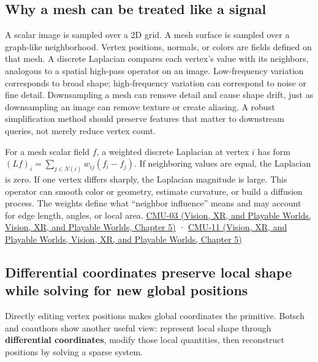 \subsection{Why a mesh can be treated like a signal}\label{03-visual-computing-i-ch002-why-a-mesh-can-be-treated-like-a-signal}

A scalar image is sampled over a 2D grid. A mesh surface is sampled over a graph-like neighborhood. Vertex positions, normals, or colors are fields defined on that mesh. A discrete Laplacian compares each vertex's value with its neighbors, analogous to a spatial high-pass operator on an image. Low-frequency variation corresponds to broad shape; high-frequency variation can correspond to noise or fine detail. Downsampling a mesh can remove detail and cause shape drift, just as downsampling an image can remove texture or create aliasing. A robust simplification method should preserve features that matter to downstream queries, not merely reduce vertex count.

For a mesh scalar field \(f\), a weighted discrete Laplacian at vertex \(i\) has form \((Lf)_i=\sum_{j\in N(i)}w_{ij}(f_i-f_j)\). If neighboring values are equal, the Laplacian is zero. If one vertex differs sharply, the Laplacian magnitude is large. This operator can smooth color or geometry, estimate curvature, or build a diffusion process. The weights define what ``neighbor influence'' means and may account for edge length, angles, or local area. \href{../07-Vision-XR-and-Playable-Worlds/main.pdf\#nameddest=04-visual-computing-ii-ch036-cmu-03---vector-calculus-preview}{CMU-03 (Vision, XR, and Playable Worlds, Vision, XR, and Playable Worlds, Chapter 5)} · \href{../07-Vision-XR-and-Playable-Worlds/main.pdf\#nameddest=04-visual-computing-ii-ch036-cmu-11---digital-geometry-processing}{CMU-11 (Vision, XR, and Playable Worlds, Vision, XR, and Playable Worlds, Chapter 5)}

\subsection{Differential coordinates preserve local shape while solving for new global positions}\label{03-visual-computing-i-ch002-differential-coordinates-preserve-local-shape-while-solving-for-new-global-positions}

Directly editing vertex positions makes global coordinates the primitive. Botsch and coauthors show another useful view: represent local shape through \textbf{differential coordinates}, modify those local quantities, then reconstruct positions by solving a sparse system.

